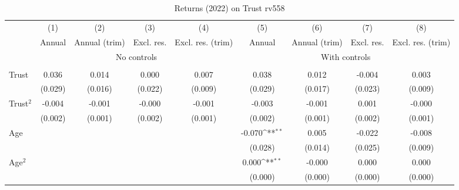 \begin{table}[htbp]\centering
\def\sym#1{\ifmmode^{#1}\else\(^{#1}\)\fi}
\caption{Returns (2022) on Trust rv558}
\begin{tabular}{l*{8}{c}}
\toprule
          &\multicolumn{1}{c}{(1)}&\multicolumn{1}{c}{(2)}&\multicolumn{1}{c}{(3)}&\multicolumn{1}{c}{(4)}&\multicolumn{1}{c}{(5)}&\multicolumn{1}{c}{(6)}&\multicolumn{1}{c}{(7)}&\multicolumn{1}{c}{(8)}\\
          &\multicolumn{1}{c}{Annual}&\multicolumn{1}{c}{Annual (trim)}&\multicolumn{1}{c}{Excl. res.}&\multicolumn{1}{c}{Excl. res. (trim)}&\multicolumn{1}{c}{Annual}&\multicolumn{1}{c}{Annual (trim)}&\multicolumn{1}{c}{Excl. res.}&\multicolumn{1}{c}{Excl. res. (trim)}\\
& \multicolumn{4}{c}{No controls} & \multicolumn{4}{c}{With controls} \\\\ \cmidrule(lr){2-5}\cmidrule(lr){6-9}
Trust     &    0.036         &    0.014         &    0.000         &    0.007         &    0.038         &    0.012         &   -0.004         &    0.003         \\
          &  (0.029)         &  (0.016)         &  (0.022)         &  (0.009)         &  (0.029)         &  (0.017)         &  (0.023)         &  (0.009)         \\
Trust$^{2}$&   -0.004         &   -0.001         &   -0.000         &   -0.001         &   -0.003         &   -0.001         &    0.001         &   -0.000         \\
          &  (0.002)         &  (0.001)         &  (0.002)         &  (0.001)         &  (0.002)         &  (0.001)         &  (0.002)         &  (0.001)         \\
Age       &                  &                  &                  &                  &   -0.070\sym{**} &    0.005         &   -0.022         &   -0.008         \\
          &                  &                  &                  &                  &  (0.028)         &  (0.014)         &  (0.025)         &  (0.009)         \\
Age$^{2}$ &                  &                  &                  &                  &    0.000\sym{**} &   -0.000         &    0.000         &    0.000         \\
          &                  &                  &                  &                  &  (0.000)         &  (0.000)         &  (0.000)         &  (0.000)         \\

\end{tabular}
\end{table}
